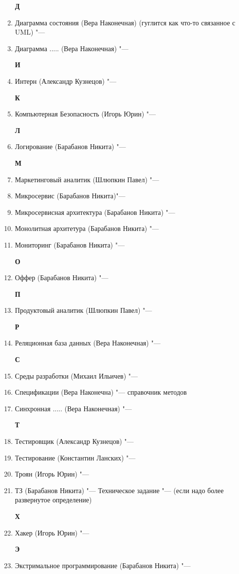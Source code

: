 \documentclass{article}
\begin{document}
\begin{enumerate}
    \textbf{Д}
    \item {Диаграмма состояния (Вера Наконечная) (гуглится как что-то связанное с UML) "--- }
    \item {Диаграмма ..... (Вера Наконечная) "--- }

    \textbf{И}
    \item {Интерн (Александр Кузнецов) "--- }

    \textbf{К}
    \item {Компьютерная Безопасность (Игорь Юрин) "--- }

    \textbf{Л}
    \item {Логирование (Барабанов Никита) "---}

    \textbf{М}
    \item  {Маркетинговый аналитик (Шлюпкин Павел) "--- }
    \item {Микросервис (Барабанов Никита)"---}
    \item {Микросервисная архитектура (Барабанов Никита) "---}
    \item {Монолитная архитетура (Барабанов Никита) "--- }
    \item {Мониторинг (Барабанов Никита) "--- }
    
    \textbf{О}
    \item {Оффер (Барабанов Никита) "---}
    
    \textbf{П}
    \item {Продуктовый аналитик (Шлюпкин Павел) "---}
    
    \textbf{Р}
    \item {Реляционная база данных (Вера Наконечная) "---}

    \textbf{С}
    \item {Среды разработки (Михаил Ильичев) "--- }
    \item {Спецификации (Вера Наконечна) "--- справочник методов}
    \item {Синхронная ..... (Вера Наконечная) "---}
    
    \textbf{Т}
    \item {Тестировщик (Александр Кузнецов) "--- }
    \item {Тестирование (Константин Ланских) "--- }
    \item {Троян (Игорь Юрин) "--- }
    \item {ТЗ (Барабанов Никита) "--- Техническое задание "--- (если надо более развернутое определение)}

    \textbf{Х}
    \item {Хакер (Игорь Юрин) "---}

    \textbf{Э}
    \item {Экстримальное программирование (Барабанов Никита) "---}

\end{enumerate}
\end{document}
